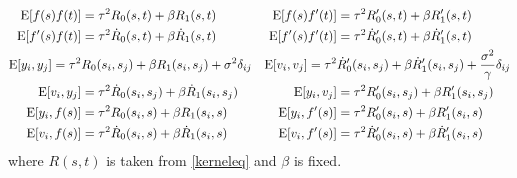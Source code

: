 \begin{align*}
\mathrm{E}\lbrack f(s)f (t)\rbrack &=\tau^2R_0(s,t)+\beta R_1(s,t) & \mathrm{E} \lbrack f(s)f '(t)\rbrack&=\tau^2R_0'(s,t)+\beta R_1'(s,t) \\
\mathrm{E}\lbrack f '(s)f (t)\rbrack&=\tau^2\dot{R}_0(s,t)+\beta\dot{R}_1(s,t) & \mathrm{E}\lbrack f '(s)f '(t)\rbrack&=\tau^2\dot{R}'_0(s,t)+\beta\dot{R}'_1(s,t) \\
\footnotesize \mathrm{E}\lbrack y_i,y_j\rbrack=\tau^2 & R_0(s_i,s_j)+\beta R_1(s_i,s_j)+\sigma^2\delta_{ij}   & 
\mathrm{E} \lbrack v_i,v_j\rbrack=\tau^2&\dot{R}'_0(s_i,s_j)+\beta\dot{R}'_1(s_i,s_j) +\frac{\sigma^2}{\gamma}\delta_{ij} \\ 
\normalsize
\mathrm{E}\lbrack v_i,y_j\rbrack&=\tau^2\dot{R}_0(s_i,s_j)+\beta \dot{R}_1(s_i,s_j) &
\mathrm{E}\lbrack y_i,v_j\rbrack&=\tau^2R_0'(s_i,s_j)+\beta R_1'(s_i,s_j)\\
\mathrm{E}\lbrack y_i,f(s)\rbrack&=\tau^2 R_0(s_i,s)+\beta R_1(s_i,s)  & \mathrm{E}\lbrack y_i,f '(s)\rbrack&=\tau^2 R'_0(s_i,s)+\beta R'_1(s_i,s)  \\
\mathrm{E}\lbrack v_i,f(s)\rbrack&=\tau^2 \dot{R}_0(s_i,s)+\beta \dot{R}_1(s_i,s) & \mathrm{E}\lbrack v_i,f '(s)\rbrack&=\tau^2\dot{R}'_0(s_i,s)+\beta \dot{R}'_1(s_i,s)
\end{align*}
\normalsize where $R(s,t)$ is taken from \eqref{kerneleq} and $\beta$ is fixed. 


